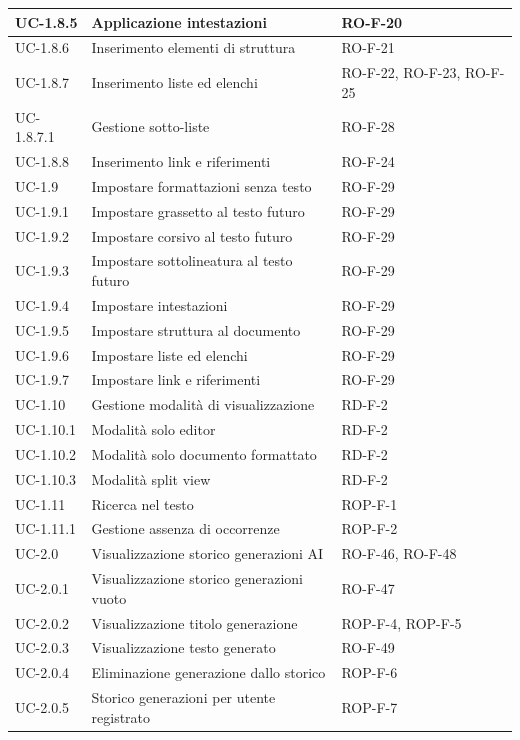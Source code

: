 \documentclass[11pt,a4paper]{article}
\begin{document}
\begin{longtable}{|p{}|p{}|>{\raggedright\arraybackslash}p{}|}
\hline
UC-1.8.5 & Applicazione intestazioni & RO-F-20 \\
\hline
UC-1.8.6 & Inserimento elementi di struttura & RO-F-21 \\
\hline
UC-1.8.7 & Inserimento liste ed elenchi & RO-F-22, RO-F-23, RO-F-25 \\
\hline
UC-1.8.7.1 & Gestione sotto-liste & RO-F-28 \\
\hline
UC-1.8.8 & Inserimento link e riferimenti & RO-F-24 \\
\hline
UC-1.9 & Impostare formattazioni senza testo & RO-F-29 \\
\hline
UC-1.9.1 & Impostare grassetto al testo futuro & RO-F-29 \\
\hline
UC-1.9.2 & Impostare corsivo al testo futuro & RO-F-29 \\
\hline
UC-1.9.3 & Impostare sottolineatura al testo futuro & RO-F-29 \\
\hline
UC-1.9.4 & Impostare intestazioni & RO-F-29 \\
\hline
UC-1.9.5 & Impostare struttura al documento & RO-F-29 \\
\hline
UC-1.9.6 & Impostare liste ed elenchi & RO-F-29 \\
\hline
UC-1.9.7 & Impostare link e riferimenti & RO-F-29 \\
\hline
UC-1.10 & Gestione modalità di visualizzazione & RD-F-2 \\
\hline
UC-1.10.1 & Modalità solo editor & RD-F-2 \\
\hline
UC-1.10.2 & Modalità solo documento formattato & RD-F-2 \\
\hline
UC-1.10.3 & Modalità split view & RD-F-2 \\
\hline
UC-1.11 & Ricerca nel testo & ROP-F-1 \\
\hline
UC-1.11.1 & Gestione assenza di occorrenze & ROP-F-2 \\
\hline
UC-2.0 & Visualizzazione storico generazioni AI & RO-F-46, RO-F-48 \\
\hline
UC-2.0.1 & Visualizzazione storico generazioni vuoto & RO-F-47 \\
\hline
UC-2.0.2 & Visualizzazione titolo generazione & ROP-F-4, ROP-F-5 \\
\hline
UC-2.0.3 & Visualizzazione testo generato & RO-F-49 \\
\hline
UC-2.0.4 & Eliminazione generazione dallo storico & ROP-F-6 \\
\hline
UC-2.0.5 & Storico generazioni per utente registrato & ROP-F-7 \\
\hline

\end{longtable}
\end{document}

